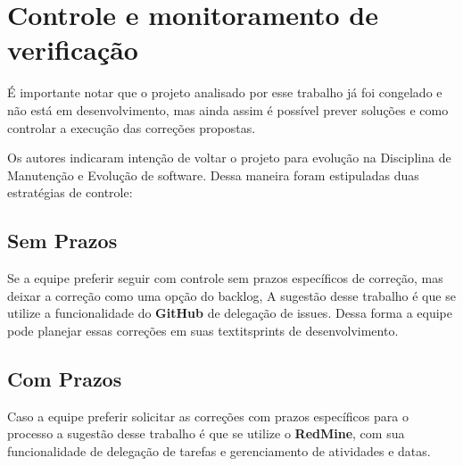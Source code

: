 \chapter{Controle e monitoramento de verificação}

É importante notar que o projeto analisado por esse trabalho já foi congelado 
e não está em desenvolvimento, mas ainda assim é possível prever soluções e 
como controlar a execução das correções propostas.

Os autores indicaram intenção de voltar o projeto para evolução na Disciplina de 
Manutenção e Evolução de software. Dessa maneira foram estipuladas duas estratégias 
de controle:

\section{Sem Prazos}

Se a equipe preferir seguir com controle sem prazos específicos de correção,
mas deixar a correção como uma opção do backlog, A sugestão desse trabalho é
que se utilize a funcionalidade do \textbf{GitHub} de delegação de issues. Dessa forma
a equipe pode planejar essas correções em suas textit{sprints} de desenvolvimento.


\section{Com Prazos}

Caso a equipe preferir solicitar as correções com prazos específicos para o processo
a sugestão desse trabalho é que se utilize o \textbf{RedMine}, com sua funcionalidade
de delegação de tarefas e gerenciamento de atividades e datas.
